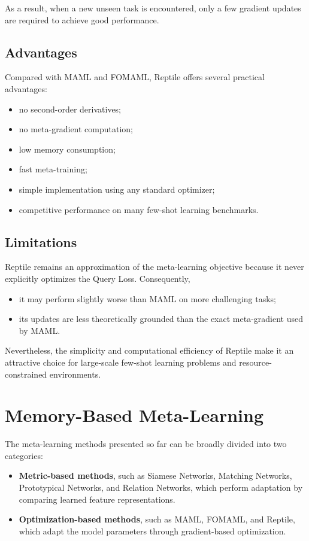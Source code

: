 As a result, when a new unseen task is encountered, only a few gradient updates are required to achieve good performance.
\subsection*{Advantages}

Compared with MAML and FOMAML, Reptile offers several practical advantages:

\begin{itemize}
\item no second-order derivatives;
\item no meta-gradient computation;
\item low memory consumption;
\item fast meta-training;
\item simple implementation using any standard optimizer;
\item competitive performance on many few-shot learning benchmarks.
\end{itemize}
\subsection*{Limitations}

Reptile remains an approximation of the meta-learning objective because it never explicitly optimizes the Query Loss. Consequently,

\begin{itemize}
\item it may perform slightly worse than MAML on more challenging tasks;
\item its updates are less theoretically grounded than the exact meta-gradient used by MAML.
\end{itemize}

Nevertheless, the simplicity and computational efficiency of Reptile make it an attractive choice for large-scale few-shot learning problems and resource-constrained environments.

\section{Memory-Based Meta-Learning}

The meta-learning methods presented so far can be broadly divided into two categories:

\begin{itemize}
    \item \textbf{Metric-based methods}, such as Siamese Networks, Matching Networks, Prototypical Networks, and Relation Networks, which perform adaptation by comparing learned feature representations.
    \item \textbf{Optimization-based methods}, such as MAML, FOMAML, and Reptile, which adapt the model parameters through gradient-based optimization.
\end{itemize}


